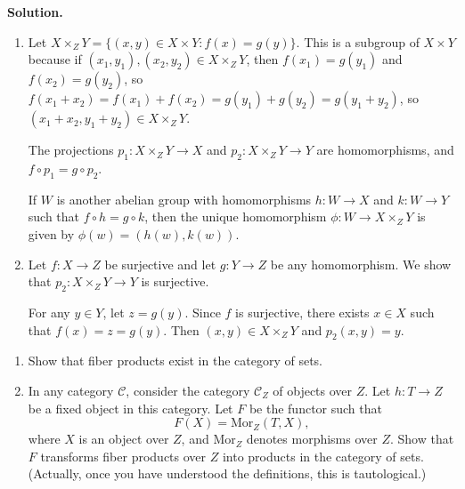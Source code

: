 \noindent\textbf{Solution.}
\begin{enumerate}[label=(\alph*)]
\item Let $X \times_Z Y = \{(x, y) \in X \times Y : f(x) = g(y)\}$. This is a subgroup of $X \times Y$ because if $(x_1, y_1), (x_2, y_2) \in X \times_Z Y$, then $f(x_1) = g(y_1)$ and $f(x_2) = g(y_2)$, so $f(x_1 + x_2) = f(x_1) + f(x_2) = g(y_1) + g(y_2) = g(y_1 + y_2)$, so $(x_1 + x_2, y_1 + y_2) \in X \times_Z Y$.

The projections $p_1: X \times_Z Y \to X$ and $p_2: X \times_Z Y \to Y$ are homomorphisms, and $f \circ p_1 = g \circ p_2$.

If $W$ is another abelian group with homomorphisms $h: W \to X$ and $k: W \to Y$ such that $f \circ h = g \circ k$, then the unique homomorphism $\phi: W \to X \times_Z Y$ is given by $\phi(w) = (h(w), k(w))$.

\item Let $f: X \to Z$ be surjective and let $g: Y \to Z$ be any homomorphism. We show that $p_2: X \times_Z Y \to Y$ is surjective.

For any $y \in Y$, let $z = g(y)$. Since $f$ is surjective, there exists $x \in X$ such that $f(x) = z = g(y)$. Then $(x, y) \in X \times_Z Y$ and $p_2(x, y) = y$.
\end{enumerate}

\begin{problembox}
\begin{enumerate}[label=(\alph*)]
\item Show that fiber products exist in the category of sets.
\item In any category $\mathcal{C}$, consider the category $\mathcal{C}_Z$ of objects over $Z$. Let $h: T \rightarrow Z$ be a fixed object in this category. Let $F$ be the functor such that
\[F(X) = \text{Mor}_Z(T, X),\]
where $X$ is an object over $Z$, and $\text{Mor}_Z$ denotes morphisms over $Z$. Show that $F$ transforms fiber products over $Z$ into products in the category of sets. (Actually, once you have understood the definitions, this is tautological.)
\end{enumerate}
\end{problembox}

